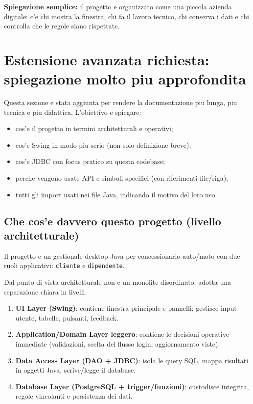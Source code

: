 \documentclass[12pt,a4paper]{article}
\begin{document}
\textbf{Spiegazione semplice:} il progetto e organizzato come una piccola azienda digitale: c'e chi mostra la finestra, chi fa il lavoro tecnico, chi conserva i dati e chi controlla che le regole siano rispettate.

\newpage
\section{Estensione avanzata richiesta: spiegazione molto piu approfondita}
Questa sezione e stata aggiunta per rendere la documentazione piu lunga, piu tecnica e piu didattica.
L'obiettivo e spiegare:
\begin{itemize}
  \item cos'e il progetto in termini architetturali e operativi;
  \item cos'e Swing in modo piu serio (non solo definizione breve);
  \item cos'e JDBC con focus pratico su questa codebase;
  \item perche vengono usate API e simboli specifici (con riferimenti file/riga);
  \item tutti gli import usati nei file Java, indicando il motivo del loro uso.
\end{itemize}

\subsection{Che cos'e davvero questo progetto (livello architetturale)}
Il progetto e un gestionale desktop Java per concessionario auto/moto con due ruoli applicativi:
\texttt{cliente} e \texttt{dipendente}.

Dal punto di vista architetturale non e un monolite disordinato: adotta una separazione chiara in livelli.
\begin{enumerate}
  \item \textbf{UI Layer (Swing)}: contiene finestra principale e pannelli; gestisce input utente, tabelle, pulsanti, feedback.
  \item \textbf{Application/Domain Layer leggero}: contiene le decisioni operative immediate (validazioni, scelta del flusso login, aggiornamento viste).
  \item \textbf{Data Access Layer (DAO + JDBC)}: isola le query SQL, mappa risultati in oggetti Java, scrive/legge il database.
  \item \textbf{Database Layer (PostgreSQL + trigger/funzioni)}: custodisce integrita, regole vincolanti e persistenza dei dati.
\end{enumerate}
\end{document}
